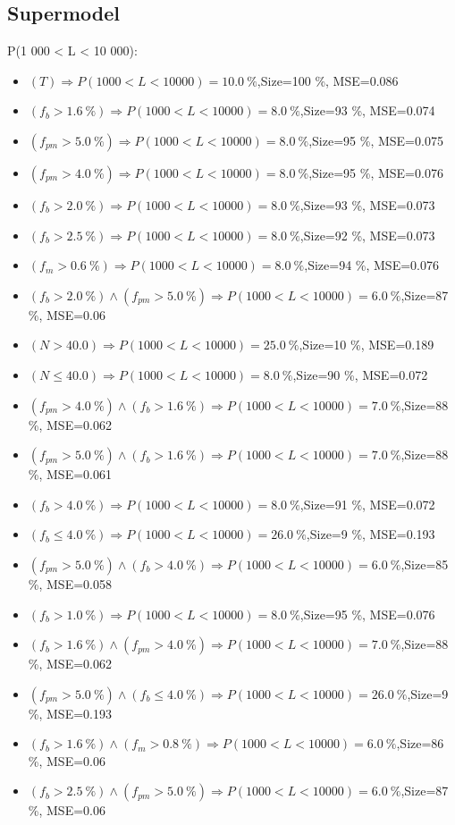 \documentclass[numbered]{CSL}
\begin{document}
\subsection{Supermodel}
P(1 000 < L < 10 000):
\begin{itemize}
\item $(T) \Rightarrow P(1 000 < L < 10 000) = 10.0~\%$,\hfill Size=100 \%, MSE=0.086
\item $(f_b > 1.6~\%) \Rightarrow P(1 000 < L < 10 000) = 8.0~\%$,\hfill Size=93 \%, MSE=0.074
\item $(f_{pm} > 5.0~\%) \Rightarrow P(1 000 < L < 10 000) = 8.0~\%$,\hfill Size=95 \%, MSE=0.075
\item $(f_{pm} > 4.0~\%) \Rightarrow P(1 000 < L < 10 000) = 8.0~\%$,\hfill Size=95 \%, MSE=0.076
\item $(f_b > 2.0~\%) \Rightarrow P(1 000 < L < 10 000) = 8.0~\%$,\hfill Size=93 \%, MSE=0.073
\item $(f_b > 2.5~\%) \Rightarrow P(1 000 < L < 10 000) = 8.0~\%$,\hfill Size=92 \%, MSE=0.073
\item $(f_m > 0.6~\%) \Rightarrow P(1 000 < L < 10 000) = 8.0~\%$,\hfill Size=94 \%, MSE=0.076
\item $(f_b > 2.0~\%) \land (f_{pm} > 5.0~\%) \Rightarrow P(1 000 < L < 10 000) = 6.0~\%$,\hfill Size=87 \%, MSE=0.06
\item $(N > 40.0) \Rightarrow P(1 000 < L < 10 000) = 25.0~\%$,\hfill Size=10 \%, MSE=0.189
\item $(N \leq 40.0) \Rightarrow P(1 000 < L < 10 000) = 8.0~\%$,\hfill Size=90 \%, MSE=0.072
\item $(f_{pm} > 4.0~\%) \land (f_b > 1.6~\%) \Rightarrow P(1 000 < L < 10 000) = 7.0~\%$,\hfill Size=88 \%, MSE=0.062
\item $(f_{pm} > 5.0~\%) \land (f_b > 1.6~\%) \Rightarrow P(1 000 < L < 10 000) = 7.0~\%$,\hfill Size=88 \%, MSE=0.061
\item $(f_b > 4.0~\%) \Rightarrow P(1 000 < L < 10 000) = 8.0~\%$,\hfill Size=91 \%, MSE=0.072
\item $(f_b \leq 4.0~\%) \Rightarrow P(1 000 < L < 10 000) = 26.0~\%$,\hfill Size=9 \%, MSE=0.193
\item $(f_{pm} > 5.0~\%) \land (f_b > 4.0~\%) \Rightarrow P(1 000 < L < 10 000) = 6.0~\%$,\hfill Size=85 \%, MSE=0.058
\item $(f_b > 1.0~\%) \Rightarrow P(1 000 < L < 10 000) = 8.0~\%$,\hfill Size=95 \%, MSE=0.076
\item $(f_b > 1.6~\%) \land (f_{pm} > 4.0~\%) \Rightarrow P(1 000 < L < 10 000) = 7.0~\%$,\hfill Size=88 \%, MSE=0.062
\item $(f_{pm} > 5.0~\%) \land (f_b \leq 4.0~\%) \Rightarrow P(1 000 < L < 10 000) = 26.0~\%$,\hfill Size=9 \%, MSE=0.193
\item $(f_b > 1.6~\%) \land (f_m > 0.8~\%) \Rightarrow P(1 000 < L < 10 000) = 6.0~\%$,\hfill Size=86 \%, MSE=0.06
\item $(f_b > 2.5~\%) \land (f_{pm} > 5.0~\%) \Rightarrow P(1 000 < L < 10 000) = 6.0~\%$,\hfill Size=87 \%, MSE=0.06
\end{itemize}
\end{document}
